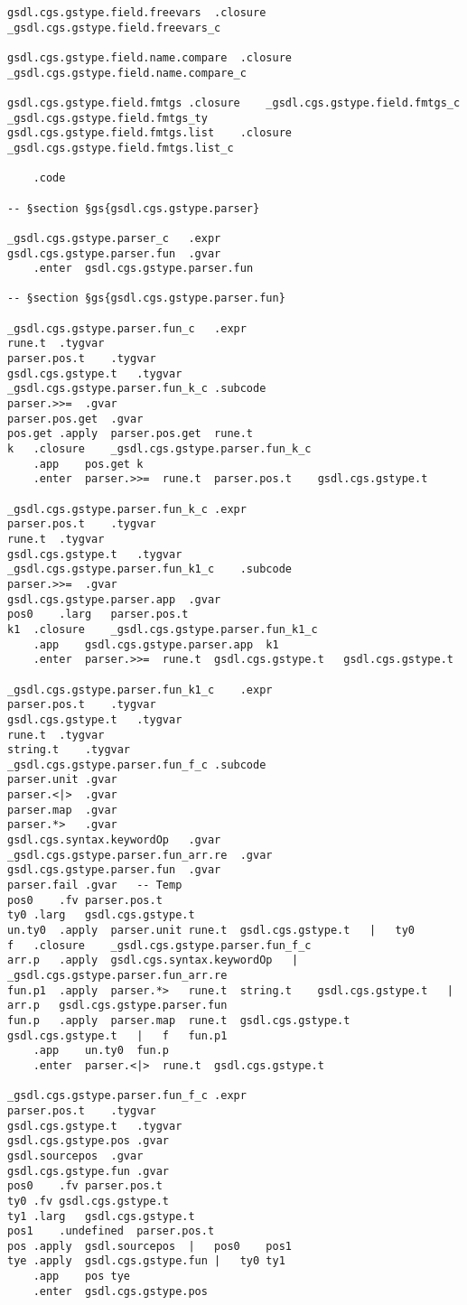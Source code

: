 \documentclass{report}
\begin{document}
\begin{verbatim}
gsdl.cgs.gstype.field.freevars	.closure	_gsdl.cgs.gstype.field.freevars_c

gsdl.cgs.gstype.field.name.compare	.closure	_gsdl.cgs.gstype.field.name.compare_c

gsdl.cgs.gstype.field.fmtgs	.closure	_gsdl.cgs.gstype.field.fmtgs_c	_gsdl.cgs.gstype.field.fmtgs_ty
gsdl.cgs.gstype.field.fmtgs.list	.closure	_gsdl.cgs.gstype.field.fmtgs.list_c

	.code

-- §section §gs{gsdl.cgs.gstype.parser}

_gsdl.cgs.gstype.parser_c	.expr
gsdl.cgs.gstype.parser.fun	.gvar
	.enter	gsdl.cgs.gstype.parser.fun

-- §section §gs{gsdl.cgs.gstype.parser.fun}

_gsdl.cgs.gstype.parser.fun_c	.expr
rune.t	.tygvar
parser.pos.t	.tygvar
gsdl.cgs.gstype.t	.tygvar
_gsdl.cgs.gstype.parser.fun_k_c	.subcode
parser.>>=	.gvar
parser.pos.get	.gvar
pos.get	.apply	parser.pos.get	rune.t
k	.closure	_gsdl.cgs.gstype.parser.fun_k_c
	.app	pos.get	k
	.enter	parser.>>=	rune.t	parser.pos.t	gsdl.cgs.gstype.t

_gsdl.cgs.gstype.parser.fun_k_c	.expr
parser.pos.t	.tygvar
rune.t	.tygvar
gsdl.cgs.gstype.t	.tygvar
_gsdl.cgs.gstype.parser.fun_k1_c	.subcode
parser.>>=	.gvar
gsdl.cgs.gstype.parser.app	.gvar
pos0	.larg	parser.pos.t
k1	.closure	_gsdl.cgs.gstype.parser.fun_k1_c
	.app	gsdl.cgs.gstype.parser.app	k1
	.enter	parser.>>=	rune.t	gsdl.cgs.gstype.t	gsdl.cgs.gstype.t

_gsdl.cgs.gstype.parser.fun_k1_c	.expr
parser.pos.t	.tygvar
gsdl.cgs.gstype.t	.tygvar
rune.t	.tygvar
string.t	.tygvar
_gsdl.cgs.gstype.parser.fun_f_c	.subcode
parser.unit	.gvar
parser.<|>	.gvar
parser.map	.gvar
parser.*>	.gvar
gsdl.cgs.syntax.keywordOp	.gvar
_gsdl.cgs.gstype.parser.fun_arr.re	.gvar
gsdl.cgs.gstype.parser.fun	.gvar
parser.fail	.gvar	-- Temp
pos0	.fv	parser.pos.t
ty0	.larg	gsdl.cgs.gstype.t
un.ty0	.apply	parser.unit	rune.t	gsdl.cgs.gstype.t	|	ty0
f	.closure	_gsdl.cgs.gstype.parser.fun_f_c
arr.p	.apply	gsdl.cgs.syntax.keywordOp	|	_gsdl.cgs.gstype.parser.fun_arr.re
fun.p1	.apply	parser.*>	rune.t	string.t	gsdl.cgs.gstype.t	|	arr.p	gsdl.cgs.gstype.parser.fun
fun.p	.apply	parser.map	rune.t	gsdl.cgs.gstype.t	gsdl.cgs.gstype.t	|	f	fun.p1
	.app	un.ty0	fun.p
	.enter	parser.<|>	rune.t	gsdl.cgs.gstype.t

_gsdl.cgs.gstype.parser.fun_f_c	.expr
parser.pos.t	.tygvar
gsdl.cgs.gstype.t	.tygvar
gsdl.cgs.gstype.pos	.gvar
gsdl.sourcepos	.gvar
gsdl.cgs.gstype.fun	.gvar
pos0	.fv	parser.pos.t
ty0	.fv	gsdl.cgs.gstype.t
ty1	.larg	gsdl.cgs.gstype.t
pos1	.undefined	parser.pos.t
pos	.apply	gsdl.sourcepos	|	pos0	pos1
tye	.apply	gsdl.cgs.gstype.fun	|	ty0	ty1
	.app	pos	tye
	.enter	gsdl.cgs.gstype.pos


\end{verbatim}
\end{document}
